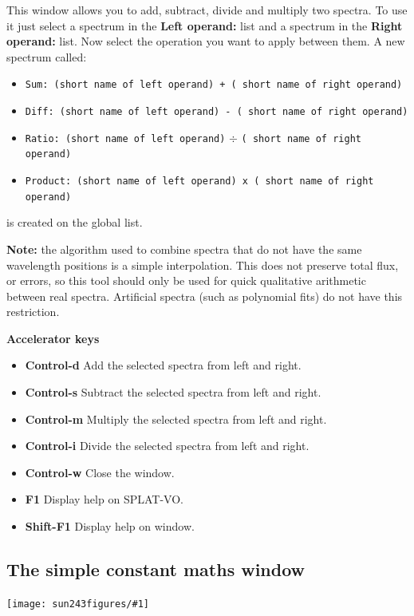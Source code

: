 \documentclass[twoside,11pt]{article}
\newcommand{\htmladdimg}[1]{}
\newcommand{\latexhtml}[2]{#1}
\renewcommand{\_}{\texttt{\symbol{95}}}
\newcommand{\SPLAT}{\textsf{SPLAT-VO}}
\newcommand{\mainfigure}[1]
{\begin{center}
 \latexhtml{\texttt{[image: sun243\_figures/\#1]}}{\htmladdimg{#1.gif}}
 \end{center}
}
\newcommand{\labelitem}[1]{\textbf{#1}}
\newcommand{\hitext}[1]{\texttt{#1}}
\newcommand{\subheading}[1]{\textbf{\large{#1}}}
\begin{document}
This window allows you to add, subtract, divide and multiply two spectra. To
use it just select a spectrum in the
\labelitem{Left operand:} list and a spectrum in the
\labelitem{Right operand:} list. Now select the operation you want to
apply between them. A new spectrum called:
\begin{itemize}
  \item \hitext{Sum: (short name of left operand) + ( short name of
        right operand)}
  \item \hitext{Diff: (short name of left operand) - ( short name of
        right operand)}
  \item \hitext{Ratio: (short name of left operand)} $\div$ \hitext{( short
        name of right operand)}
  \item \hitext{Product: (short name of left operand) x ( short name
        of right operand)}
\end{itemize}
is created on the global list.

\textbf{Note:} the algorithm used to combine spectra that do not have
the same wavelength positions is a simple interpolation. This does not
preserve total flux, or errors, so this tool should only be used for
quick qualitative arithmetic between real spectra. Artificial spectra
(such as polynomial fits) do not have this restriction.

\subheading{Accelerator keys}

\begin{itemize}
\item \labelitem{Control-d} Add the selected spectra from left and right.
\item \labelitem{Control-s} Subtract the selected spectra from left and right.
\item \labelitem{Control-m} Multiply the selected spectra from left and right.
\item \labelitem{Control-i} Divide the selected spectra from left and right.
\item \labelitem{Control-w} Close the window.
\item \labelitem{F1} Display help on \SPLAT.
\item \labelitem{Shift-F1} Display help on window.
\end{itemize}


\newpage
\subsection{The simple constant maths window}

\mainfigure{unarymathwindow}
\end{document}
